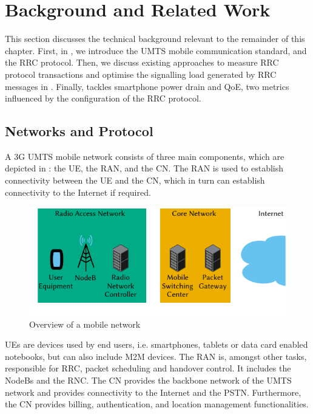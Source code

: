 \section{Background and Related Work}\label{sec:network:background}
This section discusses the technical background relevant to the remainder of this chapter.
First, in , we introduce the \gls{UMTS} mobile communication standard, and the \gls{RRC} protocol.
Then, we discuss existing approaches to measure \gls{RRC} protocol transactions and optimise the signalling load generated by \gls{RRC} messages in .
Finally,  tackles smartphone power drain and \gls{QoE}, two metrics influenced by the configuration of the \gls{RRC} protocol.

\subsection{ Networks and  Protocol}\label{sec:network:background:umts_rrc}
A \gls{3G} \gls{UMTS} mobile network consists of three main components, which are depicted in : the \gls{UE}, the \gls{RAN}, and the \gls{CN}.
The \gls{RAN} is used to establish connectivity between the \gls{UE} and the \gls{CN}, which in turn can establish connectivity to the Internet if required.

\begin{figure}
	\centering
	\includegraphics{network/background/figures/mobile_network_overview}
	\caption{Overview of a mobile network}
	\label{fig:network:background:mobile_network_overview}
\end{figure}

\glspl{UE} are devices used by end users, i.e. smartphones, tablets or data card enabled notebooks, but can also include \gls{M2M} devices.
The \gls{RAN} is, amongst other tasks, responsible for \gls{RRC}, packet scheduling and handover control.
It includes the \glspl{NodeB} and the \gls{RNC}.
The \gls{CN} provides the backbone network of the \gls{UMTS} network and provides connectivity to the Internet and the \gls{PSTN}.
Furthermore, the \gls{CN} provides billing, authentication, and location management functionalities.

